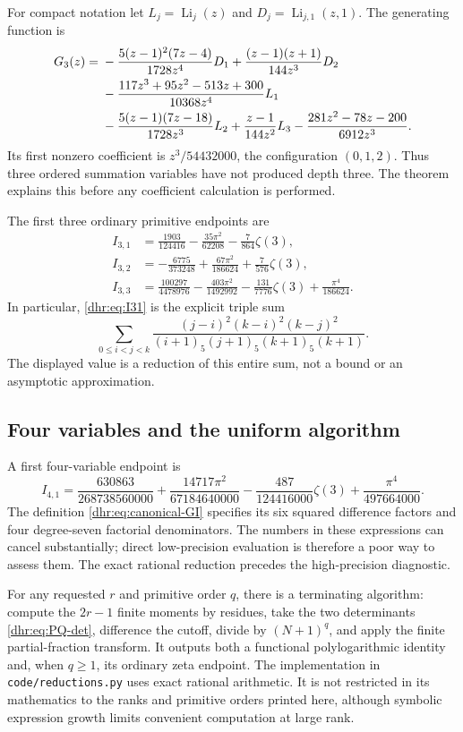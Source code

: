 \documentclass[11pt,letterpaper]{article}
\numberwithin{equation}{section}
\theoremstyle{definition}\newtheorem{definition}[theorem]{Definition}
\theoremstyle{remark}\newtheorem{remark}[theorem]{Remark}
\DeclareMathOperator{\Li}{Li}
\begin{document}
For compact notation let $L_j=\Li_j(z)$ and
$D_j=\Li_{j,1}(z,1)$. The generating function is
\begin{align}
 G_3(z)={}&-\frac{5(z-1)^2(7z-4)}{1728z^4}D_1
        +\frac{(z-1)(z+1)}{144z^3}D_2\notag\\
 &-\frac{117z^3+95z^2-513z+300}{10368z^4}L_1\notag\\
 &-\frac{5(z-1)(7z-18)}{1728z^3}L_2
        +\frac{z-1}{144z^2}L_3
        -\frac{281z^2-78z-200}{6912z^3}.
 \label{dhr:eq:r3-G}
\end{align}
Its first nonzero coefficient is $z^3/54432000$, the configuration
$(0,1,2)$. Thus three ordered summation variables have not produced
depth three. The theorem explains this before any coefficient
calculation is performed.

The first three ordinary primitive endpoints are
\begin{align}
 I_{3,1}&=\frac{1903}{124416}
          -\frac{35\pi^2}{62208}-\frac7{864}\zeta(3),
 \label{dhr:eq:I31}\\
 I_{3,2}&=-\frac{6775}{373248}
          +\frac{67\pi^2}{186624}+\frac7{576}\zeta(3),
 \label{dhr:eq:I32}\\
 I_{3,3}&=\frac{100297}{4478976}
          -\frac{403\pi^2}{1492992}-\frac{131}{7776}\zeta(3)
          +\frac{\pi^4}{186624}.
 \label{dhr:eq:I33}
\end{align}
In particular, \eqref{dhr:eq:I31} is the explicit triple sum
\[
 \sum_{0\leq i<j<k}
 \frac{(j-i)^2(k-i)^2(k-j)^2}
 {(i+1)_5(j+1)_5(k+1)_5(k+1)}.
\]
The displayed value is a reduction of this entire sum, not a bound or
an asymptotic approximation.

\subsection{Four variables and the uniform algorithm}
A first four-variable endpoint is
\begin{equation}\label{dhr:eq:I41}
 I_{4,1}=\frac{630863}{268738560000}
 +\frac{14717\pi^2}{67184640000}
 -\frac{487}{124416000}\zeta(3)
 +\frac{\pi^4}{497664000}.
\end{equation}
The definition \eqref{dhr:eq:canonical-GI} specifies its six squared
difference factors and four degree-seven factorial denominators.
The numbers in these expressions can cancel substantially; direct
low-precision evaluation is therefore a poor way to assess them.
The exact rational reduction precedes the high-precision diagnostic.

For any requested $r$ and primitive order $q$, there is a terminating
algorithm: compute the $2r-1$ finite moments by residues, take the two
determinants \eqref{dhr:eq:PQ-det}, difference the cutoff, divide by
$(N+1)^q$, and apply the finite partial-fraction transform. It outputs
both a functional polylogarithmic identity and, when $q\geq1$, its
ordinary zeta endpoint. The implementation in \texttt{code/reductions.py}
uses exact rational arithmetic. It is not restricted in its mathematics
to the ranks and primitive orders printed here, although symbolic
expression growth limits convenient computation at large rank.
\end{document}

